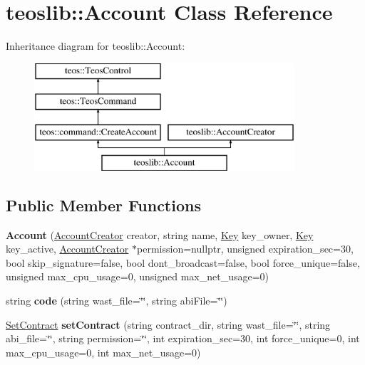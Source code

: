 \hypertarget{classteoslib_1_1_account}{}\section{teoslib\+:\+:Account Class Reference}
\label{classteoslib_1_1_account}
Inheritance diagram for teoslib\+:\+:Account\+:\begin{figure}[H]
\begin{center}
\leavevmode
\includegraphics[height=4.000000cm]{classteoslib_1_1_account}
\end{center}
\end{figure}
\subsection*{Public Member Functions}
\begin{DoxyCompactItemize}
\item 
\mbox{\label{classteoslib_1_1_account_accc80e8c32a712084c9456e1514e8b80}} 
{\bfseries Account} (\mbox{\hyperlink{classteoslib_1_1_account_creator}{Account\+Creator}} creator, string name, \mbox{\hyperlink{classteoslib_1_1_key}{Key}} key\+\_\+owner, \mbox{\hyperlink{classteoslib_1_1_key}{Key}} key\+\_\+active, \mbox{\hyperlink{classteoslib_1_1_account_creator}{Account\+Creator}} $\ast$permission=nullptr, unsigned expiration\+\_\+sec=30, bool skip\+\_\+signature=false, bool dont\+\_\+broadcast=false, bool force\+\_\+unique=false, unsigned max\+\_\+cpu\+\_\+usage=0, unsigned max\+\_\+net\+\_\+usage=0)
\item 
\mbox{\label{classteoslib_1_1_account_ae841f147020eed8ec8696fcd0364e621}} 
string {\bfseries code} (string wast\+\_\+file=\char`\"{}\char`\"{}, string abi\+File=\char`\"{}\char`\"{})
\item 
\mbox{\label{classteoslib_1_1_account_a6021c9f58302a088cfe103b6e32d422d}} 
\mbox{\hyperlink{classteos_1_1command_1_1_set_contract}{Set\+Contract}} {\bfseries set\+Contract} (string contract\+\_\+dir, string wast\+\_\+file=\char`\"{}\char`\"{}, string abi\+\_\+file=\char`\"{}\char`\"{}, string permission=\char`\"{}\char`\"{}, int expiration\+\_\+sec=30, int force\+\_\+unique=0, int max\+\_\+cpu\+\_\+usage=0, int max\+\_\+net\+\_\+usage=0)
\end{DoxyCompactItemize}
